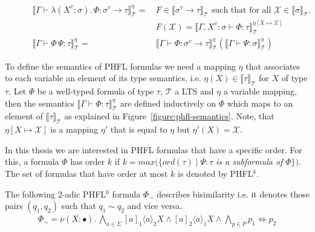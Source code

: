 \begin{figure}
\begin{align*}
        \llbracket \Gamma \vdash \lambda (X^v \colon \sigma).\,\Phi \colon \sigma^v \rightarrow \tau \rrbracket
        ^\eta_\mathcal{T} =\,& F \in \llbracket \sigma^v \rightarrow \tau \rrbracket_\mathcal{T} \text{ such that for
        all }
        \mathcal{X} \in \llbracket \sigma \rrbracket_\mathcal{T}.\, \\
        &F(\mathcal{X}) = \llbracket \Gamma, X^v \colon \sigma \vdash \Phi \colon \tau \rrbracket^{\eta[X \mapsto
        \mathcal{X}]}_\mathcal{T}\\
        \llbracket \Gamma \vdash \Phi\,\Psi \colon \tau \rrbracket^\eta_\mathcal{T} =\,& \llbracket \Gamma \vdash \Phi
        \colon \sigma
        ^v \rightarrow \tau \rrbracket ^\eta_\mathcal{T}(\llbracket \Gamma \vdash \Psi \colon \sigma \rrbracket ^\eta_\mathcal{T})
    \end{align*}
\end{figure}

To define the semantics of PHFL formulas we need a mapping $\eta$ that associates to each variable an element of its
type semantics, i.e. $\eta(X) \in \llbracket\tau\rrbracket_\mathcal{T}$ for $X$ of type $\tau$. Let $\Phi$ be a
well-typed formula of type $\tau$, $\mathcal{T}$ a LTS and $\eta$ a variable mapping, then the semantics
$\llbracket\Gamma \vdash \Phi\colon \tau \rrbracket^\eta_\mathcal{T}$ are defined inductively on $\Phi$ which maps to
an element of $\llbracket\tau\rrbracket_\mathcal{T}$ as explained in Figure~\ref{figure:phfl-semantics}.
Note, that $\eta[X \mapsto \mathcal{X}]$ is a mapping $\eta'$ that is equal to $\eta$ but $\eta'(X) = \mathcal{X}$.

In this thesis we are interested in PHFL formulas that have a specific order. For this, a formula $\Phi$ has order $k$
if $k = max(\{ord(\tau)\mid \Psi \colon \tau$ \textit{is a subformula of} $\Phi\})$. The set of formulas that have
order at most $k$ is denoted by PHFL$^k$.

\begin{example}{\cite{lange2014capturing}}
    \label{example:phfl_order_0}
    The following $2$-adic PHFL$^0$ formula $\Phi_\sim$ describes bisimilarity i.e. it denotes
    those pairs $(q_1, q_2)$ such that $q_1 \sim q_2$ and vice versa.
    \begin{align*}
        \Phi_\sim = \nu (X \colon \bullet).\,
        \underset{a \in \Sigma}{\bigwedge} [a]_1 \langle a \rangle_2 X \wedge [a]_2 \langle a \rangle_1 X \wedge
        \underset{p \in P}{\bigwedge} p_1 \Leftrightarrow p_2
    \end{align*}
\end{example}

